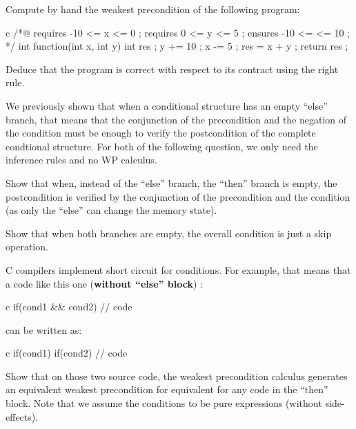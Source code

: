 




Compute by hand the weakest precondition of the following program:


\begin{CodeBlock}{c}
/*@
  requires -10 <= x <= 0 ;
  requires 0 <= y <= 5 ;
  ensures -10 <= \result <= 10 ;
*/
int function(int x, int y){
  int res ;
  y += 10 ;
  x -= 5 ;
  res = x + y ;
  return res ;
}
\end{CodeBlock}


Deduce that the program is correct with respect to its contract using the
right rule.




We previously shown that when a conditional structure has an empty ``else''
branch, that means that the conjunction of the precondition and the negation
of the condition must be enough to verify the postcondition of the complete
condtional structure.
For both of the following question, we only need the inference rules and
no WP calculus.

Show that when, instead of the ``else'' branch, the ``then'' branch is empty,
the postcondition is verified by the conjunction of the precondition and
the condition (as only the ``else'' can change the memory state).

Show that when both branches are empty, the overall condition is just a
skip operation.




C compilers implement short circuit for conditions. For example, that
means that a code like this one (\textbf{without ``else'' block}) :


\begin{CodeBlock}{c}
if(cond1 && cond2){
  // code
}
\end{CodeBlock}



can be written as:



\begin{CodeBlock}{c}
if(cond1){
  if(cond2){
    // code
  }
}
\end{CodeBlock}



Show that on those two source code, the weakest precondition calculus
generates an equivalent weakest precondition for equivalent for any code
in the ``then'' block. Note that we assume the conditions to be pure
expressions (without side-effects).



